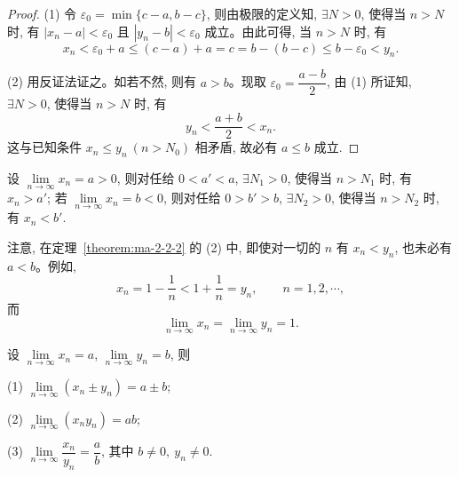 \begin{proof}
(1) 令 $\varepsilon_0=\min\{c-a,b-c\}$, 则由极限的定义知, $\exists N>0$, 使得当 $n>N$ 时, 有 $|x_n-a|<\varepsilon_0$ 且 $|y_n-b|<\varepsilon_0$ 成立。由此可得, 当 $n>N$ 时, 有
\[
  x_n<\varepsilon_0+a\leqslant(c-a)+a=c=b-(b-c)\leqslant b-\varepsilon_0<y_n.
\]

(2) 用反证法证之。如若不然, 则有 $a>b$。现取 $\varepsilon_0=\dfrac{a-b}{2}$, 由 (1) 所证知, $\exists N>0$, 使得当 $n>N$ 时, 有
\[
  y_n<\frac{a+b}{2}<x_n.
\]
这与已知条件 $x_n\leqslant y_n\ (n>N_0)$ 相矛盾, 故必有 $a\leqslant b$ 成立.
\end{proof}


\begin{corollary}\label{corollary:ma-2-source-35}
设 $\lim\limits_{n\to\infty}x_n=a>0$, 则对任给 $0<a'<a$, $\exists N_1>0$, 使得当 $n>N_1$ 时, 有 $x_n>a'$; 若 $\lim\limits_{n\to\infty}x_n=b<0$, 则对任给 $0>b'>b$, $\exists N_2>0$, 使得当 $n>N_2$ 时, 有 $x_n<b'$.
\end{corollary}


\begin{remark}\label{remark:ma-2-source-36}
注意, 在定理~\ref{theorem:ma-2-2-2} 的 (2) 中, 即使对一切的 $n$ 有 $x_n<y_n$, 也未必有 $a<b$。例如,
\[
  x_n=1-\frac1n<1+\frac1n=y_n,\qquad n=1,2,\cdots,
\]
而
\[
  \lim_{n\to\infty}x_n=\lim_{n\to\infty}y_n=1.
\]
\end{remark}


\begin{theorem}[{极限的四则运算}]\label{theorem:ma-2-2-3}
设 $\lim\limits_{n\to\infty}x_n=a$, $\lim\limits_{n\to\infty}y_n=b$, 则

(1) $\lim\limits_{n\to\infty}(x_n\pm y_n)=a\pm b$;

(2) $\lim\limits_{n\to\infty}(x_ny_n)=ab$;

(3) $\lim\limits_{n\to\infty}\dfrac{x_n}{y_n}=\dfrac ab$, 其中 $b\ne0,\ y_n\ne0$.
\end{theorem}



